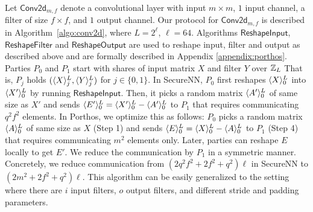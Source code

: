Let $\mathsf{Conv2d}_{m,f}$ denote a convolutional layer with input $m\times m$, $1$ input channel, a filter of size $f\times f$, and $1$ output channel. 
Our protocol for $\mathsf{Conv2d}_{m,f}$ is described in Algorithm~\ref{algo:conv2d}, where $L = 2^\ell$, $\ell=64$. Algorithms  $\mathsf{ReshapeInput}$, $\mathsf{ReshapeFilter}$ and $\mathsf{ReshapeOutput}$ are used to reshape input, filter and output as described above and are formally described in Appendix \ref{appendix:porthos}. 
Parties $P_0$ and $P_1$ start with shares of input matrix $X$ and filter $Y$ over $\mathbb{Z}_L$ That is, $P_j$ holds $(\langle X\rangle^{L}_{j}, \langle Y\rangle^{L}_{j})$ for $j \in \{0,1\}$.
In SecureNN, $P_0$ first reshapes $\langle X\rangle^{L}_{0}$ into $\langle X'\rangle^{L}_{0}$ by running $\mathsf{ReshapeInput}$. Then, it picks a random matrix $\langle A'\rangle^{L}_{0}$ of same size as $X'$ and sends $\langle E'\rangle^{L}_{0} = \langle X'\rangle^{L}_{0} - \langle A'\rangle^{L}_{0}$ to $P_1$ that requires communicating $q^2f^2$ elements.
In Porthos, we optimize this as follows: $P_0$ picks a random matrix $\langle A\rangle^{L}_{0}$ of same size as $X$ (Step 1) and sends $\langle E\rangle^{L}_{0} = \langle X\rangle^{L}_{0} - \langle A\rangle^{L}_{0}$ to $P_1$ (Step 4) that requires communicating $m^2$ elements only. Later, parties can reshape $E$ locally to get $E'$. 
We reduce the communication by $P_1$ in a symmetric manner.
Concretely, we reduce communication from $(2q^2f^2+2f^2+q^2)\ell$ in SecureNN to $(2m^2+2f^2+q^2)\ell$.
This algorithm can  be easily generalized to the setting where there are $i$ input filters, $o$ output filters, and different stride and padding parameters. 


